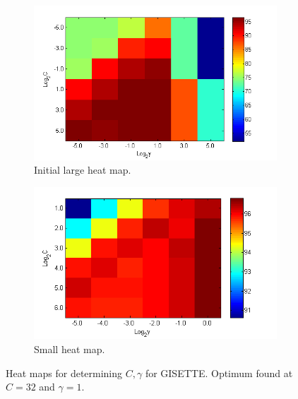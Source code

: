 \documentclass[12pt,a4paper,twocolumn]{article}
\begin{document}
\begin{figure}
        \centering
        \begin{subfigure}[b]{0.4\textwidth}
                \includegraphics[width=\textwidth]{img/gisette_large.png}
                \caption{Initial large heat map.}
                \label{fig:heat_map_large}
        \end{subfigure}
        \begin{subfigure}[b]{0.4\textwidth}
                \includegraphics[width=\textwidth]{img/gisette_small.png}
                \caption{Small heat map.}
                \label{fig:heat_map_med}
        \end{subfigure}
	
        \caption{{\footnotesize Heat maps for determining $C, \gamma$ for GISETTE. Optimum found at $C=32$ and $\gamma =1$.}}
        \label{fig:heat_maps_gisette}
\end{figure}
\end{document}
